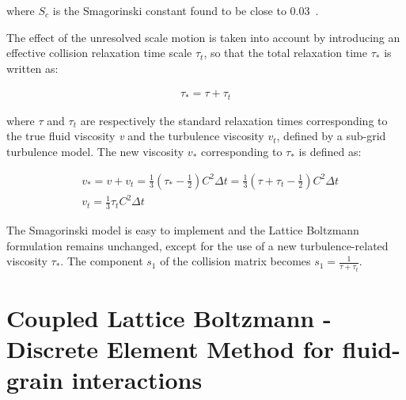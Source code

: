 where $\mathit{S}_{c}$ is the Smagorinski constant found to be close to 
0.03~\citep{yu2005}. 

The effect of the unresolved scale motion is taken into account by introducing 
an effective collision relaxation time scale $\tau_{t}$, so that the total 
relaxation time $\tau_{*}$ is written as:

\begin{align}
\tau_{*}=\tau + \tau_{t}
\end{align} 

where $\tau$ and $\tau_{t}$ are respectively the standard relaxation times 
corresponding to the true fluid viscosity \textit{v} and the turbulence 
viscosity $\mathit{v}_{\mathit{t}}$, defined by a sub-grid turbulence model. 
The new viscosity $\mathit{v}_{*}$ corresponding to $\tau_{*}$ is defined as:

\begin{align}
& 
\mathit{v}_{*}=\mathit{v}+\mathit{v}_{\mathit{t}}=\frac{1}{3}(\tau_{*}-\frac{1}{2})
\mathit{C}^{2} \Delta \mathit{t} 
=\frac{1}{3}(\tau+\tau_{t}-\frac{1}{2})\mathit{C}^{2} \Delta \mathit{t}  \\
& \mathit{v}_{\mathit{t}}=\frac{1}{3}\tau_{\mathit{t}}\mathit{C}^{2} \Delta 
\textit{t}
\end{align} 

The Smagorinski model is easy to implement and the Lattice Boltzmann 
formulation remains unchanged, except for the use of a new turbulence-related 
viscosity $\tau_{*}$. The component $s_1$ of the collision matrix becomes $s_1 
= \frac{1}{\tau+\tau_t}$.


\section[Coupled LB-DEM for fluid--grain interactions]{Coupled Lattice 
Boltzmann - Discrete Element Method for fluid-grain
interactions}

